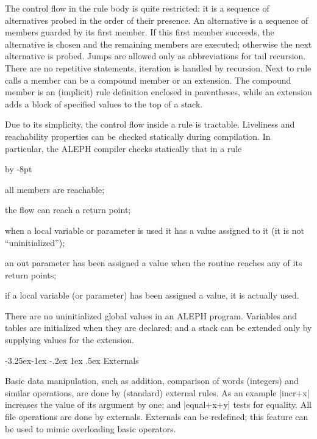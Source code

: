 \documentclass{article}
\makeatletter
\newcommand\A{\textsf{ALEPH}}
\newcommand\g[1]{\textsf{#1}}
\renewenvironment{itemize}{\begin{list}{}{%
\advance\leftmargin by -8pt%
\setlength\itemsep{0ex plus 0.2ex}%
\setlength\partopsep{3pt}%
\setlength\topsep{2pt plus 2pt}%
\setlength\parsep{0pt plus 2pt}%
}}{\end{list}}
\renewcommand\subsection{%
\@startsection{subsection}{2}{\z@}%
   {-3.25ex\@plus -1ex \@minus -.2ex}%
   {1ex \@plus .5ex}%
   {\normalfont\normalsize\bfseries}}
\makeatother
\begin{document}
The control flow in the rule body is quite restricted: it is a sequence of
alternatives probed in the order of their presence. An alternative is a
sequence of members guarded by its first member. If this first member
succeeds, the alternative is chosen and the remaining members are executed;
otherwise the next alternative is probed. Jumps are allowed only as
abbreviations for tail recursion. There are no repetitive statements,
iteration is handled by recursion. Next to rule calls a member can be a
\g{compound member} or an \g{extension}. The compound member is an
(implicit) rule definition enclosed in parentheses, while an extension adds
a block of specified values to the top of a stack.

Due to its simplicity, the control flow inside a rule is tractable.
Liveliness and reachability properties can be checked statically during
compilation. In particular, the \A{} compiler checks statically that in a
rule
\begin{itemize}
\item[$\bullet$] all members are reachable;
\item[$\bullet$] the flow can reach a return point;
\item[$\bullet$] when a local variable or parameter is used it has a value
  assigned to it (it is not ``uninitialized'');
\item[$\bullet$] an out parameter has been assigned a value when the routine
 reaches any of its return points;
\item[$\bullet$] if a local variable (or parameter) has been assigned a
value, it is actually used.
\end{itemize}

There are no uninitialized global values in an \A{} program. Variables and
tables are initialized when they are declared; and a stack can be extended
only by supplying values for the extension.

\subsection{Externals}

Basic data manipulation, such as addition, comparison of words (integers)
and similar operations, are done by (standard) external rules. As an example
\pp|incr+x| increases the value of its argument by one; and \pp|equal+x+y|
tests for equality. All file operations are done by externals. Externals can
be redefined; this feature can be used to mimic overloading basic operators.
\end{document}
